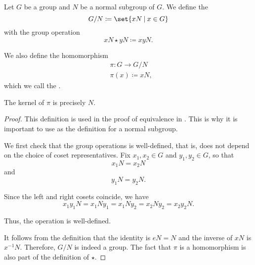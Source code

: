 \begin{definition}\label{def:quotient_group}
  Let \( G \) be a group and \( N \) be a normal subgroup of \( G \). We define the 
  \begin{equation*}
    G / N \coloneqq \set{ x N \given x \in G }
  \end{equation*}
  with the group operation
  \begin{equation*}
    x N \star y N \coloneqq xy N.
  \end{equation*}

  We also define the homomorphism
  \begin{align*}
    &\pi: G \to G / N \\
    &\pi(x) \coloneqq x N,
  \end{align*}
  which we call the .

  The kernel of \( \pi \) is precisely \( N \).
\end{definition}
\begin{proof}
  This definition is used in the proof of equivalence in . This is why it is important to use  as the definition for a normal subgroup.

  We first check that the group operations is well-defined, that is, does not depend on the choice of coset representatives. Fix \( x_1, x_2 \in G \) and \( y_1, y_2 \in G \), so that
  \begin{equation*}
    x_1 N = x_2 N
  \end{equation*}
  and
  \begin{equation*}
    y_1 N = y_2 N.
  \end{equation*}

  Since the left and right cosets coincide, we have
  \begin{equation*}
    x_1 y_1 N = x_1 N y_1 = x_1 N y_2 = x_2 N y_2 = x_2 y_2 N.
  \end{equation*}

  Thus, the operation is well-defined.

  It follows from the definition that the identity is \( e N = N \) and the inverse of \( x N \) is \( x^{-1} N \). Therefore, \( G / N \) is indeed a group. The fact that \( \pi \) is a homomorphism is also part of the definition of \( \star \).
\end{proof}

